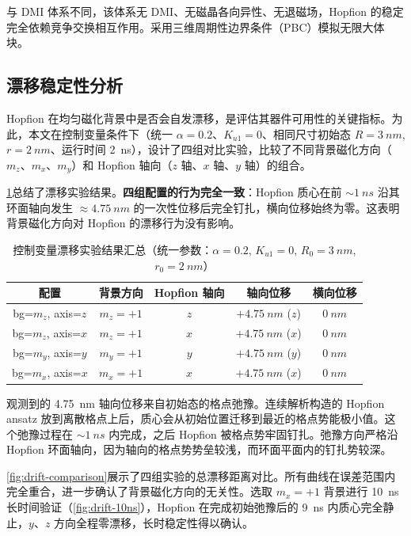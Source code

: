 与 DMI 体系不同，该体系无 DMI、无磁晶各向异性、无退磁场，Hopfion 的稳定完全依赖竞争交换相互作用。采用三维周期性边界条件（PBC）模拟无限大体块。

\subsection{漂移稳定性分析}

Hopfion 在均匀磁化背景中是否会自发漂移，是评估其器件可用性的关键指标。为此，本文在控制变量条件下（统一 $\alpha = 0.2$、$K_{u1} = 0$、相同尺寸初始态 $R = \SI{3}{nm}$, $r = \SI{2}{nm}$、运行时间 \SI{2}{ns}），设计了四组对比实验，比较了不同背景磁化方向（$m_z$、$m_x$、$m_y$）和 Hopfion 轴向（$z$ 轴、$x$ 轴、$y$ 轴）的组合。

\cref{tab:drift-results}总结了漂移实验结果。\textbf{四组配置的行为完全一致}：Hopfion 质心在前 $\sim\SI{1}{ns}$ 沿其环面轴向发生 $\approx \SI{4.75}{nm}$ 的一次性位移后完全钉扎，横向位移始终为零。这表明背景磁化方向对 Hopfion 的漂移行为没有影响。

\begin{table}[htbp]
  \centering
  \caption{控制变量漂移实验结果汇总（统一参数：$\alpha = 0.2$, $K_{u1} = 0$, $R_0 = \SI{3}{nm}$, $r_0 = \SI{2}{nm}$）}
  \label{tab:drift-results}
  \begin{tabular}{ccccc}
    \toprule
    配置 & 背景方向 & Hopfion 轴向 & 轴向位移 & 横向位移 \\
    \midrule
    bg=$m_z$, axis=$z$ & $m_z = +1$ & $z$ & $+\SI{4.75}{nm}$ ($z$) & $\SI{0}{nm}$ \\
    bg=$m_z$, axis=$x$ & $m_z = +1$ & $x$ & $+\SI{4.75}{nm}$ ($x$) & $\SI{0}{nm}$ \\
    bg=$m_y$, axis=$y$ & $m_y = +1$ & $y$ & $+\SI{4.75}{nm}$ ($y$) & $\SI{0}{nm}$ \\
    bg=$m_x$, axis=$x$ & $m_x = +1$ & $x$ & $+\SI{4.75}{nm}$ ($x$) & $\SI{0}{nm}$ \\
    \bottomrule
  \end{tabular}
\end{table}

观测到的 \SI{4.75}{nm} 轴向位移来自初始态的格点弛豫。连续解析构造的 Hopfion ansatz 放到离散格点上后，质心会从初始位置迁移到最近的格点势能极小值。这个弛豫过程在 $\sim\SI{1}{ns}$ 内完成，之后 Hopfion 被格点势牢固钉扎。弛豫方向严格沿 Hopfion 环面轴向，因为轴向的格点势势垒较浅，而环面平面内的钉扎势较深。

\cref{fig:drift-comparison}展示了四组实验的总漂移距离对比。所有曲线在误差范围内完全重合，进一步确认了背景磁化方向的无关性。选取 $m_x = +1$ 背景进行 \SI{10}{ns} 长时间验证（\cref{fig:drift-10ns}），Hopfion 在完成初始弛豫后的 \SI{9}{ns} 内质心完全静止，$y$、$z$ 方向全程零漂移，长时稳定性得以确认。

